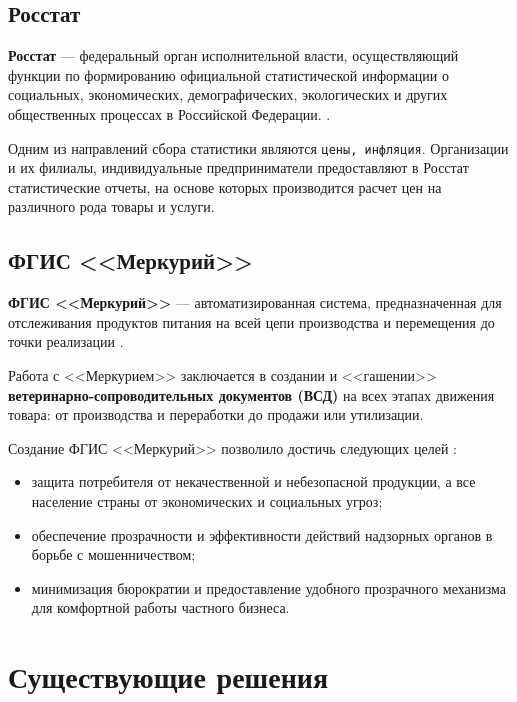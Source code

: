 
\subsection{Росстат}

\textbf{Росстат} ---  федеральный орган исполнительной власти, осуществляющий функции по формированию официальной статистической информации о социальных, экономических, демографических, экологических и других общественных процессах в Российской Федерации. \cite{info_rosstat}.

Одним из направлений сбора статистики являются \texttt{цены, инфляция}. Организации и их филиалы, индивидуальные предприниматели предоставляют в Росстат статистические отчеты, на основе которых производится расчет цен на различного рода товары и услуги.

\subsection{ФГИС <<Меркурий>>}

\textbf{ФГИС <<Меркурий>>} --- автоматизированная система, предназначенная для отслеживания продуктов питания на всей цепи производства и перемещения до точки реализации \cite{info_mercury}.

Работа с <<Меркурием>> заключается в создании и <<гашении>> \textbf{ветеринарно-сопроводительных документов (ВСД)} на всех этапах движения товара: от производства и переработки до продажи или утилизации.

\clearpage

Создание ФГИС <<Меркурий>> позволило достичь следующих целей \cite{info_mercury, info_mercury2}:

\begin{itemize}[label=--]
	\item защита потребителя от некачественной и небезопасной продукции, а все население страны от экономических и социальных угроз;
	\item обеспечение прозрачности и эффективности действий надзорных органов в борьбе с мошенничеством;
	\item минимизация бюрократии и предоставление удобного прозрачного механизма для комфортной работы частного бизнеса.
\end{itemize}


\section{Существующие решения}

